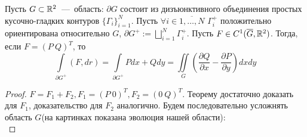 \begin{theorem}
    Пусть $G \subset \mathbb{R}^2$~---~область: $\partial G$ состоит из дизъюнктивного объединения простых кусочно-гладких контуров $\{\Gamma_i\}_{i = 1}^N$. Пусть $\forall i \in \overline{1, \ldots, N}$ $\Gamma_i^+$ положительно  ориентирована относительно $G$, $\displaystyle \partial G^+ := \bigsqcup_{i = 1}^{N} \Gamma_i^+$. Пусть $F \in C^1(\overline{G}, \mathbb{R}^2)$. Тогда, если $F = (P \  Q)^T$, то \[\int\limits_{\partial G^+} (F, dr) = \int\limits_{\partial G^+} Pdx + Qdy = \iint\limits_G \left(\dfrac{\partial Q}{\partial x} - \dfrac{\partial P}{\partial y}\right) dxdy\]
\end{theorem}
\begin{proof}
    $F = F_1 + F_2, F_1 = (P \  0)^T, F_2 = (0 \  Q)^T$. Теорему достаточно доказать для $F_1$, доказательство для $F_2$ аналогично. Будем последовательно усложнять область $G$(на картинках показана эволюция нашей области):\\


\end{proof}
